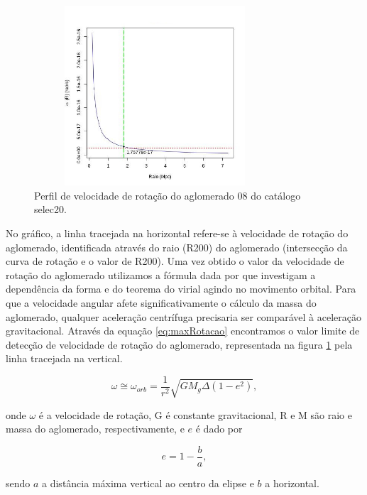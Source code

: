 \begin{figure}[H] %
\vspace{-2pt}
\begin{center}
\includegraphics[height=6.7cm,width=9cm]{04-figuras/rotacao}%
\caption{Perfil de velocidade de rotação do aglomerado 08 do catálogo selec20.}
\label{rotacao}%
\end{center}
\end{figure}

No gráfico, a linha tracejada na horizontal refere-se à velocidade de rotação do aglomerado, identificada através do raio (R200) do aglomerado (intersecção da curva de rotação e o valor de R200). Uma vez obtido o valor da velocidade de rotação do aglomerado utilizamos a fórmula dada por  que investigam a dependência da forma e do teorema do virial agindo no movimento orbital. Para que a velocidade angular afete significativamente o cálculo da massa do aglomerado, qualquer aceleração centrífuga precisaria ser comparável à aceleração gravitacional. Através da equação \ref{eq:maxRotacao} encontramos o valor limite de detecção de velocidade de rotação do aglomerado, representada na figura \ref{rotacao} pela linha tracejada na vertical.

\begin{equation}
\omega \cong \omega_{orb} = \frac{1}{r^2} \sqrt{G M_g \Delta (1 - e^2)}, 
\label{eq:maxRotacao}
\end{equation}

\noindent onde $\omega$ é a velocidade de rotação, G é constante gravitacional, R e M são raio e massa do aglomerado, respectivamente, e $e$ é dado por 

\begin{equation}
e = 1 - \frac{b}{a}, 
\label{eq:exce}
\end{equation}

\noindent sendo $a$ a distância máxima vertical ao centro da elipse e $b$ a horizontal.


